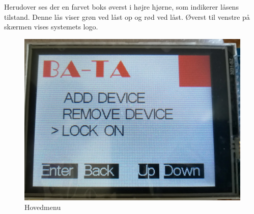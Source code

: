  Herudover ses der en farvet boks øverst i højre hjørne, som indikerer låsens tilstand. Denne lås viser grøn ved låst op og rød ved låst. Øverst til venstre på skærmen vises systemets logo.    
\begin{figure}[H]
	\centering
	\includegraphics[width = 300 pt]{Img/start.jpg}
	\caption{Hovedmenu}
	\label{fig:start}
\end{figure}

